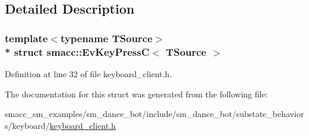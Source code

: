 \subsection{Detailed Description}
\subsubsection*{template$<$typename T\+Source$>$\\*
struct smacc\+::\+Ev\+Key\+Press\+C$<$ T\+Source $>$}



Definition at line 32 of file keyboard\+\_\+client.\+h.



The documentation for this struct was generated from the following file\+:\begin{DoxyCompactItemize}
\item 
smacc\+\_\+sm\+\_\+examples/sm\+\_\+dance\+\_\+bot/include/sm\+\_\+dance\+\_\+bot/substate\+\_\+behaviors/keyboard/\hyperlink{keyboard__client_8h}{keyboard\+\_\+client.\+h}\end{DoxyCompactItemize}

